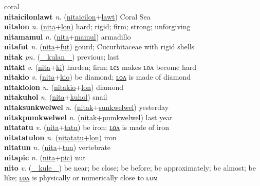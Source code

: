 coral \label{nitaicilon} \\
\textbf{nitaicilonlawt} \textit{n.} (\hyperref[nitaicilon]{nitaicilon}+\hyperref[lawt]{lawt})
Coral Sea \label{nitaicilonlawt} \\
\textbf{nitalon} \textit{n.} (\hyperref[nita]{nita}+\hyperref[lon]{lon})
hard; rigid; firm; strong; unforgiving \label{nitalon} \\
\textbf{nitamamul} \textit{n.} (\hyperref[nita]{nita}+\hyperref[mamul]{mamul})
armadillo \label{nitamamul} \\
\textbf{nitafut} \textit{n.} (\hyperref[nita]{nita}+\hyperref[fut]{fut})
gourd; Cucurbitaceae with rigid shells \label{nitafut} \\
\textbf{nitak} \textit{pn.} (\hyperref[kulan]{~~kulan~~})
previous; last \label{nitak} \\
\textbf{nitaki} \textit{v.} (\hyperref[nita]{nita}+\hyperref[ki]{ki})
harden; firm; ʟєꜱ makes ʟᴏᴧ become hard \label{nitaki} \\
\textbf{nitakio} \textit{v.} (\hyperref[nita]{nita}+\hyperref[kio]{kio})
be diamond; \hyperref[nitakiolon]{ʟᴏᴧ} is made of diamond \label{nitakio} \\
\textbf{nitakiolon} \textit{n.} (\hyperref[nitakio]{nitakio}+\hyperref[lon]{lon})
diamond \label{nitakiolon} \\
\textbf{nitakuhol} \textit{n.} (\hyperref[nita]{nita}+\hyperref[kuhol]{kuhol})
snail \label{nitakuhol} \\
\textbf{nitaksunkwelwel} \textit{n.} (\hyperref[nitak]{nitak}+\hyperref[sunkwelwel]{sunkwelwel})
yesterday \label{nitaksunkwelwel} \\
\textbf{nitakpumkwelwel} \textit{n.} (\hyperref[nitak]{nitak}+\hyperref[pumkwelwel]{pumkwelwel})
last year \label{nitakpumkwelwel} \\
\textbf{nitatatu} \textit{v.} (\hyperref[nita]{nita}+\hyperref[tatu]{tatu})
be iron; \hyperref[nitatatulon]{ʟᴏᴧ} is made of iron \label{nitatatu} \\
\textbf{nitatatulon} \textit{n.} (\hyperref[nitatatu]{nitatatu}+\hyperref[lon]{lon})
iron \label{nitatatulon} \\
\textbf{nitatun} \textit{n.} (\hyperref[nita]{nita}+\hyperref[tun]{tun})
vertebrate \label{nitatun} \\
\textbf{nitapic} \textit{n.} (\hyperref[nita]{nita}+\hyperref[pic]{pic})
nut \label{nitapic} \\
\textbf{nito} \textit{v.} (\hyperref[kule]{~~kule~~})
be near; be close; be before; be approximately; be almost; be like; \hyperref[nitolon]{ʟᴏᴧ} is physically or numerically close to ʟᴜᴍ \label{nito} \\
